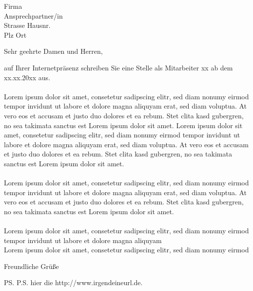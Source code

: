 \documentclass[firstfoot=false]{scrlttr2}
\begin{document}
\begin{letter}{Firma \\ Ansprechpartner/in \\ Strasse Hausnr. \\ Plz Ort}

\opening{Sehr geehrte Damen und Herren,}
auf Ihrer Internetpräsenz schreiben Sie eine Stelle als Mitarbeiter xx ab dem xx.xx.20xx aus.\\\\
Lorem ipsum dolor sit amet, consetetur sadipscing elitr, sed diam nonumy eirmod tempor invidunt ut labore et dolore magna aliquyam erat, sed diam voluptua. At vero eos et accusam et justo duo dolores et ea rebum. Stet clita kasd gubergren, no sea takimata sanctus est Lorem ipsum dolor sit amet. Lorem ipsum dolor sit amet, consetetur sadipscing elitr, sed diam nonumy eirmod tempor invidunt ut labore et dolore magna aliquyam erat, sed diam voluptua. At vero eos et accusam et justo duo dolores et ea rebum. Stet clita kasd gubergren, no sea takimata sanctus est Lorem ipsum dolor sit amet.\\\\
Lorem ipsum dolor sit amet, consetetur sadipscing elitr, sed diam nonumy eirmod tempor invidunt ut labore et dolore magna aliquyam erat, sed diam voluptua. At vero eos et accusam et justo duo dolores et ea rebum. Stet clita kasd gubergren, no sea takimata sanctus est Lorem ipsum dolor sit amet.\\\\
Lorem ipsum dolor sit amet, consetetur sadipscing elitr, sed diam nonumy eirmod tempor invidunt ut labore et dolore magna aliquyam \\
Lorem ipsum dolor sit amet, consetetur sadipscing elitr, sed diam nonumy eirmod
\closing{Freundliche Grüße}
\ps{P.S. hier die http://www.irgendeineurl.de.}
\end{letter}
\end{document}

